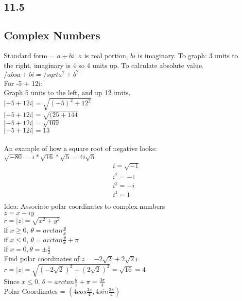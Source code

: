 \documentclass{article}
\begin{document}
        \subsection*{11.5}
        \color{Aquamarine}
        \subsection*{Complex Numbers}
            Standard form = $a + bi$. $a$ is real portion, $bi$ is imaginary. 
            To graph: 3 units to the right, imaginary is 4 so 4 units up. To calculate absolute value, $/abs{a+bi} = /sqrt{a^2 + b^2}$\\
            For -5 + 12i: \\
            Graph 5 units to the left, and up 12 units. \\
            $\lvert {-5 + 12i}\rvert = \sqrt{(-5)^2 + 12^2}$ \\
            $\lvert {-5 + 12i}\rvert = \sqrt{(25 + 144}$ \\
            $\lvert {-5 + 12i}\rvert = \sqrt{169}$ \\
            $\lvert {-5 + 12i}\rvert = 13$ \\
            \\
            An example of how a square root of negative looks: $\sqrt{-80} =  i * \sqrt{16} * \sqrt{5} = 4i \sqrt{5}$
            \begin{equation}
                \begin{split}
                    i = \sqrt{-1} \\
                    i^2 = -1 \\
                    i^3 = -i \\
                    i^4 = 1 \\
                \end{split}
            \end{equation}
            Idea: Associate polar coordinates to complex numbers \\
            $z = x+iy$ \\
            $r = \lvert z \rvert = \sqrt{x^2 + y^2}$ \\
            if $x \geq 0$, $\theta = arctan \frac{y}{x}$ \\
            if $x \leq 0$, $\theta = arctan \frac{y}{x} + \pi$ \\
            if $x = 0, \theta = \pm \frac{\pi}{2}$ \\ 
            Find polar coordinates of $z = -2\sqrt{2} + 2\sqrt{2}i$\\
            $r = \lvert z \rvert = \sqrt{(-2\sqrt{2})^2  + (2\sqrt{2})^2} = \sqrt{16} = 4$ \\
            Since $x \leq 0$, $\theta =  arctan \frac{y}{x} + \pi = \frac{3\pi}{4} $ \\
            Polar Coordinates = $(4cos\frac{3\pi}{4},4sin\frac{3\pi}{4})$
\end{document}
